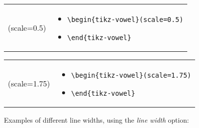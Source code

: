 \documentclass{article}
\begin{document}
\begin{center}
\begin{tabular}{rl}
  \begin{minipage}[t]{0.45\textwidth}
  \centering
	\begin{tikz-vowel}(scale=0.5)
	\end{tikz-vowel}
  \end{minipage} &
  \begin{minipage}[t]{0.2\textwidth}
  \vspace{-45pt}
  {\small
\begin{itemize}[label={}]
	\item \verb|\begin{tikz-vowel}(scale=0.5)|
	\item \verb|\end{tikz-vowel}|
\end{itemize}
    }
  \end{minipage}\\
\end{tabular}
\end{center}

\begin{center}
\begin{tabular}{rl}
  \begin{minipage}[t]{0.45\textwidth}
  \centering
	\begin{tikz-vowel}(scale=1.75)
	\end{tikz-vowel}
  \end{minipage} &
  \begin{minipage}[t]{0.2\textwidth}
  \vspace{-100pt}
  {\small
\begin{itemize}[label={}]
	\item \verb|\begin{tikz-vowel}(scale=1.75)|
	\item \verb|\end{tikz-vowel}|
\end{itemize}
    }
  \end{minipage}\\
\end{tabular}
\end{center}

\bigskip
\noindent
Examples of different line widths, using the \textit{line width} option:
\end{document}
